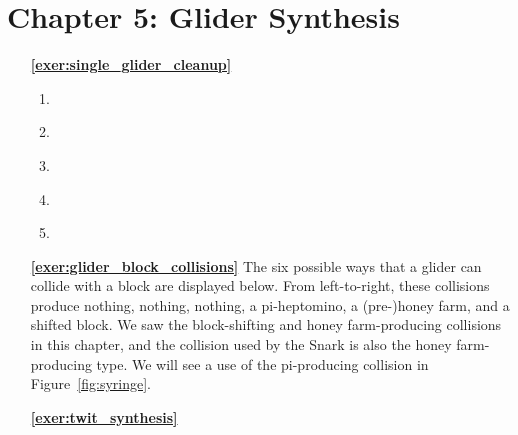 \section*{Chapter 5: Glider Synthesis}
\renewcommand{\chapterfolder}{glider_synthesis/}

\begin{multicols}{2}
\begin{itemize}[leftmargin=0em]
	\item[\bf\color{ocre}\sffamily\ref{exer:single_glider_cleanup}]
	\begin{enumerate}[leftmargin=1.5em,label=\bf\color{ocre}(\alph*)]
		\item {} \\
		
		\item {} \\
		
		\item {} \\
		
		\item {} \\
		
		\item {} \\
	\end{enumerate}
	
	
	\item[\bf\color{ocre}\sffamily\ref{exer:glider_block_collisions}] The six possible ways that a glider can collide with a block are displayed below. From left-to-right, these collisions produce nothing, nothing, nothing, a pi-heptomino, a (pre-)honey farm, and a shifted block. We saw the block-shifting and honey farm-producing collisions in this chapter, and the collision used by the Snark is also the honey farm-producing type. We will see a use of the pi-producing collision in Figure~\ref{fig:syringe}.
	\begin{center}
	\end{center}
	
	
	\item[\bf\color{ocre}\sffamily\ref{exer:twit_synthesis}]  \\
	


\end{itemize}
\end{multicols}
